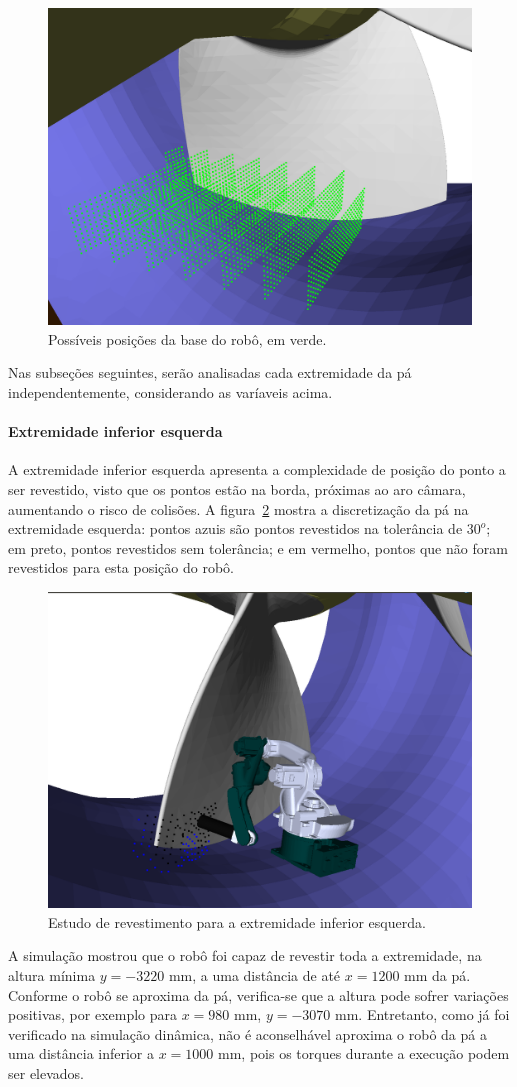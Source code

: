 \begin{figure}[!ht]
	\centering	
	\includegraphics[width=.5\columnwidth]{figs/trilho2all.png}
	\caption{Possíveis posições da base do robô, em verde.}
	\label{fig::trilho2all}
\end{figure}

Nas subseções seguintes, serão analisadas cada extremidade da
pá independentemente, considerando as varíaveis acima.

\paragraph{Extremidade inferior esquerda}

A extremidade inferior esquerda apresenta a complexidade de posição do ponto a
ser revestido, visto que os pontos estão na borda, próximas ao aro câmara,
aumentando o risco de colisões. A figura~\ref{fig::footleft} mostra a
discretização da pá na extremidade esquerda: pontos azuis são pontos revestidos
na tolerância de $30^o$; em preto, pontos revestidos sem tolerância; e em
vermelho, pontos que não foram revestidos para esta posição do robô.

\begin{figure}[!ht]
	\centering	
	\includegraphics[width=.5\columnwidth]{figs/footleft.png}
	\caption{Estudo de revestimento para a extremidade inferior esquerda.}
	\label{fig::footleft}
\end{figure}

A simulação mostrou que o robô foi capaz de revestir toda a extremidade, na
altura mínima $y=-3220$ mm, a uma distância de até $x=1200$ mm da pá. Conforme o
robô se aproxima da pá, verifica-se que a altura pode sofrer variações
positivas, por exemplo para $x=980$ mm, $y=-3070$ mm. Entretanto, como já foi
verificado na simulação dinâmica, não é aconselhável aproxima o robô da pá a uma
distância inferior a $x=1000$ mm, pois os torques durante a execução podem ser
elevados.

